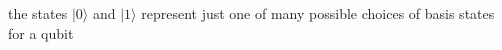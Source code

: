 \documentclass[preview]{standalone}
\begin{document}
\begin{center}
the states $|0\rangle$ and $|1\rangle$ represent just one of many possible choices of basis states for a qubit
\end{center}
\end{document}
